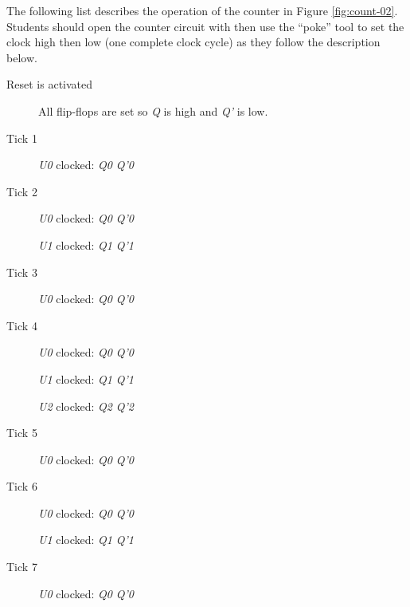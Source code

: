 The following list describes the operation of the counter in Figure \ref{fig:count-02}. Students should open the counter circuit with \LE then use the ``poke'' tool to set the clock high then low (one complete clock cycle) as they follow the description below.

\begin{description}
	\item [Reset is activated] All flip-flops are set so \textit{Q} is high and \textit{Q'} is low.
	
	\item [Tick 1] \textit{U0} clocked: \textit{Q0} \textdownarrow \: \textemdash \: \textit{Q'0} \textuparrow

	\item [Tick 2] \textit{U0} clocked: \textit{Q0} \textuparrow \: \textemdash \: \textit{Q'0} \textdownarrow
	
	\hspace{14pt}\textit{U1} clocked: \textit{Q1} \textdownarrow \: \textemdash \: \textit{Q'1} \textuparrow
	
	\item [Tick 3] \textit{U0} clocked: \textit{Q0} \textdownarrow \: \textemdash \: \textit{Q'0} \textuparrow

	\item [Tick 4] \textit{U0} clocked: \textit{Q0} \textuparrow \: \textemdash \: \textit{Q'0} \textdownarrow
	
	\hspace{14pt}\textit{U1} clocked: \textit{Q1} \textuparrow \: \textemdash \: \textit{Q'1} \textdownarrow
	
	\hspace{14pt}\textit{U2} clocked: \textit{Q2} \textdownarrow \: \textemdash \: \textit{Q'2} \textuparrow

	\item [Tick 5] \textit{U0} clocked: \textit{Q0} \textdownarrow \: \textemdash \: \textit{Q'0} \textuparrow

	\item [Tick 6] \textit{U0} clocked: \textit{Q0} \textuparrow \: \textemdash \: \textit{Q'0} \textdownarrow
	
	\hspace{14pt}\textit{U1} clocked: \textit{Q1} \textdownarrow \: \textemdash \: \textit{Q'1} \textuparrow

	\item [Tick 7] \textit{U0} clocked: \textit{Q0} \textdownarrow \: \textemdash \: \textit{Q'0} \textuparrow


\end{description}
